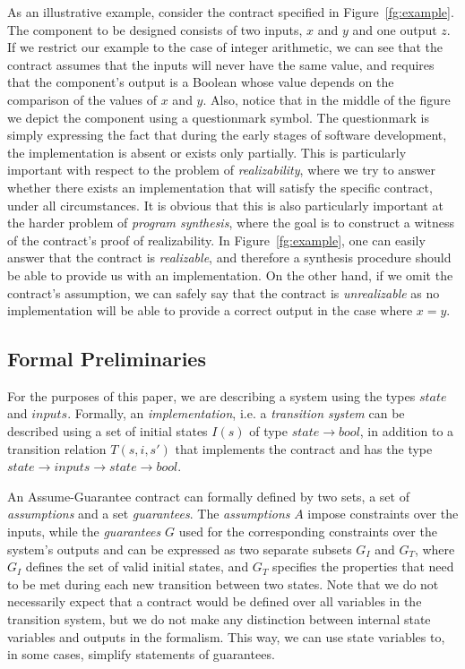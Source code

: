 As an illustrative example, consider the contract specified in
Figure~\ref{fg:example}. The component to be designed consists of two inputs,
$x$ and $y$ and one output $z$. If we restrict our example to the case of integer arithmetic,
we can see that the contract assumes that the inputs will never have the same value,
and requires that the component's output is a Boolean whose value depends on the comparison of the values of $x$ and $y$.
Also, notice that in the middle of the figure we depict the component using a
questionmark symbol. The questionmark is simply expressing the fact that during
the early stages of software development, the implementation is absent or exists only partially. This is particularly
important with respect to the problem of \textit{realizability}, where we try to
answer whether there exists an implementation that will satisfy the specific contract, under all circumstances. It is obvious that this is also
particularly important at the harder problem of \textit{program synthesis},
where the goal is to construct a witness of the contract's proof of realizability. In
Figure~\ref{fg:example}, one can easily answer that the contract is
\textit{realizable}, and therefore a synthesis procedure should be able to
provide us with an implementation. On the other hand, if we omit the contract's assumption, we can
safely say that the contract is \textit{unrealizable} as no implementation will
be able to provide a correct output in the case where $x=y$.

\subsection{Formal Preliminaries}
For the purposes of this paper, we are describing a system using the types
$state$ and $inputs$. Formally, an \textit{implementation}, i.e. a
\textit{transition system} can be described using a set of initial states $I(s)$ of type $state \rightarrow bool$, in addition to a transition relation $T(s,i,s')$ that
implements the contract and has the type $state \rightarrow inputs \rightarrow
state \rightarrow bool$.
 
An Assume-Guarantee contract can formally defined by two sets, a set of
\textit{assumptions} and a set \textit{guarantees}. The \textit{assumptions} $A$
impose constraints over the inputs, while the \textit{guarantees} $G$ used for
the corresponding constraints over the system's outputs and can be expressed as
two separate subsets $G_I$ and $G_T$, where $G_I$ defines the set of valid
initial states, and $G_T$ specifies the properties that need to be met during
each new transition between two states. Note that we do not necessarily expect
that a contract would be defined over all variables in the transition system,
but we do not make any distinction between internal state variables and outputs in the formalism.
This way, we can use state variables to, in some cases, simplify statements of guarantees.

